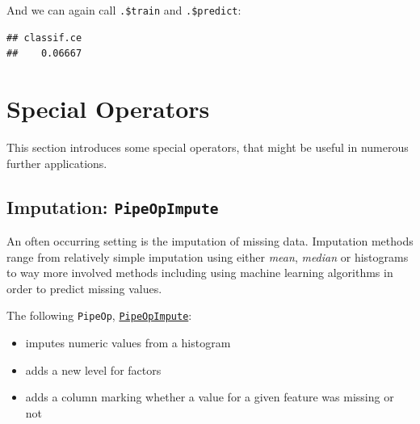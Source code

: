 \documentclass[]{scrbook}
\newenvironment{Shaded}{\begin{snugshade}}{\end{snugshade}}
\newcommand{\KeywordTok}[1]{\textcolor[rgb]{0.13,0.29,0.53}{\textbf{#1}}}
\newcommand{\NormalTok}[1]{#1}
\newcommand{\OperatorTok}[1]{\textcolor[rgb]{0.81,0.36,0.00}{\textbf{#1}}}
\newcommand{\StringTok}[1]{\textcolor[rgb]{0.31,0.60,0.02}{#1}}
\providecommand{\tightlist}{%
  \setlength{\itemsep}{0pt}\setlength{\parskip}{0pt}}
\renewenvironment{Shaded} {\begin{snugshade}\small} {\end{snugshade}}
\begin{document}
And we can again call \texttt{.\$train} and \texttt{.\$predict}:

\begin{Shaded}
\end{Shaded}

\begin{verbatim}
## classif.ce 
##    0.06667
\end{verbatim}

\hypertarget{pipe-special-ops}{%
\section{Special Operators}\label{pipe-special-ops}}

This section introduces some special operators, that might be useful in numerous further applications.

\hypertarget{imputation-pipeopimpute}{%
\subsection{\texorpdfstring{Imputation: \texttt{PipeOpImpute}}{Imputation: PipeOpImpute}}\label{imputation-pipeopimpute}}

An often occurring setting is the imputation of missing data.
Imputation methods range from relatively simple imputation using either \emph{mean}, \emph{median} or histograms to way more involved methods including using machine learning algorithms in order to predict missing values.

The following \texttt{PipeOp}, \href{https://mlr3pipelines.mlr-org.com/reference/PipeOpImpute.html}{\texttt{PipeOpImpute}}:

\begin{itemize}
\tightlist
\item
  imputes numeric values from a histogram
\item
  adds a new level for factors
\item
  adds a column marking whether a value for a given feature was missing or not
\end{itemize}
\end{document}
